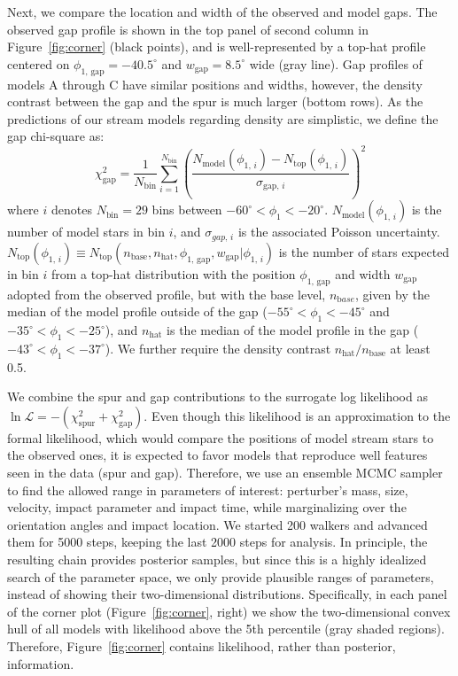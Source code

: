 \documentclass[twocolumn]{aastex62}
\begin{document}
Next, we compare the location and width of the observed and model gaps.
The observed gap profile is shown in the top panel of second column in Figure~\ref{fig:corner} (black points), and is well-represented by a top-hat profile centered on $\phi_\mathrm{1,\,gap}=-40.5^\circ$ and $w_\mathrm{gap}=8.5^\circ$ wide (gray line).
Gap profiles of models A through C have similar positions and widths, however, the density contrast between the gap and the spur is much larger (bottom rows).
As the predictions of our stream models regarding density are simplistic, we define the gap chi-square as:
\begin{equation}
\chi^2_\mathrm{gap} = \frac{1}{N_\mathrm{bin}}\sum_{i=1}^{N_\mathrm{bin}} \left(\frac{N_\mathrm{model}(\phi_{1,\,i}) - N_\mathrm{top}(\phi_{1,\,i})}{\sigma_\mathrm{gap,\,\mathit{i}}}\right)^2
\end{equation}
where $i$ denotes $N_\mathrm{bin}=29$ bins between $-60^\circ<\phi_1<-20^\circ$.
$N_\mathrm{model}(\phi_{1,\,i})$ is the number of model stars in bin $i$, and $\sigma_{gap,\,i}$ is the associated Poisson uncertainty.
$N_\mathrm{top}(\phi_{1,\,i})\equiv N_\mathrm{top}(n_\mathrm{base}, n_\mathrm{hat}, \phi_\mathrm{1,\, gap}, w_\mathrm{gap} | \phi_{1,\,i})$ is the number of stars expected in bin $i$ from a top-hat distribution with the position $\phi_\mathrm{1,\,gap}$ and width $w_\mathrm{gap}$ adopted from the observed profile, but with the base level, $n_{\mathrm base}$, given by the median of the model profile outside of the gap ($-55^\circ<\phi_1<-45^\circ$ and $-35^\circ<\phi_1<-25^\circ$), and $n_\mathrm{hat}$ is the median of the model profile in the gap ($-43^\circ<\phi_1<-37^\circ$).
We further require the density contrast $n_\mathrm{hat} / n_\mathrm{base}$ at least 0.5.

We combine the spur and gap contributions to the surrogate log likelihood as $\ln\mathcal{L} = -(\chi^2_\mathrm{spur} + \chi^2_\mathrm{gap})$.
Even though this likelihood is an approximation to the formal likelihood, which would compare the positions of model stream stars to the observed ones, it is expected to favor models that reproduce well features seen in the data (spur and gap).
Therefore, we use an ensemble MCMC sampler \citep{Foreman-Mackey:2013} to find the allowed range in parameters of interest: perturber's mass, size, velocity, impact parameter and impact time, while marginalizing over the orientation angles and impact location.
We started 200 walkers and advanced them for 5000 steps, keeping the last 2000 steps for analysis.
In principle, the resulting chain provides posterior samples, but since this is a highly idealized search of the parameter space, we only provide plausible ranges of parameters, instead of showing their two-dimensional distributions.
Specifically, in each panel of the corner plot (Figure~\ref{fig:corner}, right) we show the two-dimensional convex hull of all models with likelihood above the 5th percentile (gray shaded regions).
Therefore, Figure~\ref{fig:corner} contains likelihood, rather than posterior, information.
\end{document}

